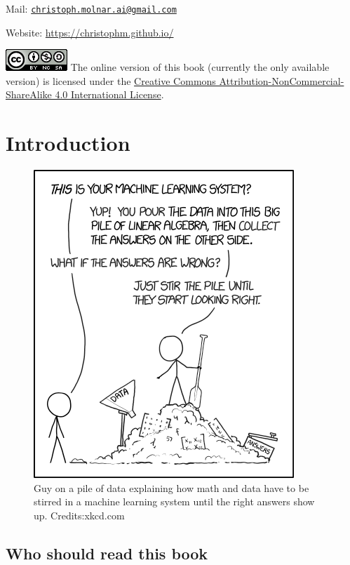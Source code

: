 \documentclass[12pt,]{krantz}
\theoremstyle{definition}
\theoremstyle{definition}
\theoremstyle{definition}
\theoremstyle{remark}
\begin{document}
Mail:
\href{mailto:christoph.molnar.ai@gmail.com}{\nolinkurl{christoph.molnar.ai@gmail.com}}

Website: \url{https://christophm.github.io/}

\includegraphics{images/by-nc-sa.png} The online version of this book
(currently the only available version) is licensed under the
\href{http://creativecommons.org/licenses/by-nc-sa/4.0/}{Creative
Commons Attribution-NonCommercial-ShareAlike 4.0 International License}.

\mainmatter

\chapter{Introduction}\label{intro}

\begin{figure}
\centering
\includegraphics{images/machine-learning-xkcd.png}
\caption{Guy on a pile of data explaining how math and data have to be
stirred in a machine learning system until the right answers show up.
Credits:xkcd.com}
\end{figure}

\section{Who should read this book}\label{who-should-read-this-book}
\end{document}
